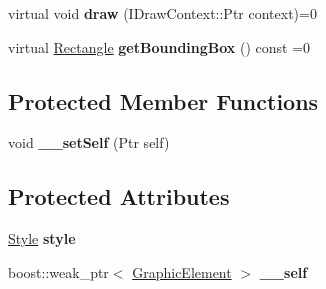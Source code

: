 \begin{DoxyCompactItemize}
\item 
\hypertarget{classsambag_1_1disco_1_1graphic_elements_1_1_graphic_element_aa80e5230533e4fa20eb5a642757fb665}{
virtual void {\bfseries draw} (IDrawContext::Ptr context)=0}
\label{classsambag_1_1disco_1_1graphic_elements_1_1_graphic_element_aa80e5230533e4fa20eb5a642757fb665}

\item 
\hypertarget{classsambag_1_1disco_1_1graphic_elements_1_1_graphic_element_acfeb23c9df7c5020a3466feca828e77d}{
virtual \hyperlink{classsambag_1_1com_1_1_rectangle}{Rectangle} {\bfseries getBoundingBox} () const =0}
\label{classsambag_1_1disco_1_1graphic_elements_1_1_graphic_element_acfeb23c9df7c5020a3466feca828e77d}

\end{DoxyCompactItemize}
\subsection*{Protected Member Functions}
\begin{DoxyCompactItemize}
\item 
\hypertarget{classsambag_1_1disco_1_1graphic_elements_1_1_graphic_element_a08f9db59983cf172e3c16c753987053f}{
void {\bfseries \_\-\_\-setSelf} (Ptr self)}
\label{classsambag_1_1disco_1_1graphic_elements_1_1_graphic_element_a08f9db59983cf172e3c16c753987053f}

\end{DoxyCompactItemize}
\subsection*{Protected Attributes}
\begin{DoxyCompactItemize}
\item 
\hypertarget{classsambag_1_1disco_1_1graphic_elements_1_1_graphic_element_aea700375a21fdde8392f08993bd44768}{
\hyperlink{classsambag_1_1disco_1_1graphic_elements_1_1_style}{Style} {\bfseries style}}
\label{classsambag_1_1disco_1_1graphic_elements_1_1_graphic_element_aea700375a21fdde8392f08993bd44768}

\item 
\hypertarget{classsambag_1_1disco_1_1graphic_elements_1_1_graphic_element_ab99026dc6f8aec4b6dc61b5f6c162825}{
boost::weak\_\-ptr$<$ \hyperlink{classsambag_1_1disco_1_1graphic_elements_1_1_graphic_element}{GraphicElement} $>$ {\bfseries \_\-\_\-self}}
\label{classsambag_1_1disco_1_1graphic_elements_1_1_graphic_element_ab99026dc6f8aec4b6dc61b5f6c162825}

\end{DoxyCompactItemize}



